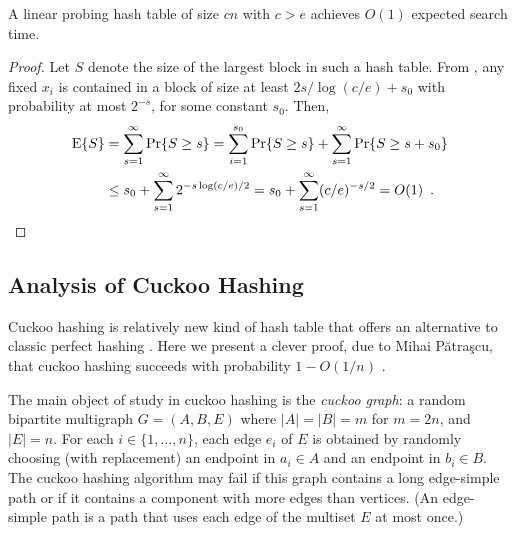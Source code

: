 \documentclass{patmorin}
\begin{document}
\begin{cor}
  A linear probing hash table of size $cn$ with $c > e$ achieves
  $O(1)$ expected search time.
\end{cor}
\begin{proof}
  Let $S$ denote the size of the largest block in such a hash
  table. From , any fixed $x_i$ is contained in
  a block of size at least $2s/\log (c/e) + s_0$ with probability at
  most $2^{-s}$, for some constant $s_0$. Then,
  \begin{align*}
    \operatorname{\mathrm{E}}\{S\} &= \sum_{s = 1}^\infty \Pr\{S \ge s\} = \sum_{i=1}^{s_0} \Pr\{S \ge s\} + \sum_{s = 1}^\infty \Pr\{S \ge s + s_0\} \\
            &\le s_0 + \sum_{s = 1}^\infty 2^{-s \log (c/e)/2} = s_0 + \sum_{s = 1}^\infty (c/e)^{-s/2} = O(1) \enspace . \qedhere
  \end{align*}
\end{proof}

\subsection{Analysis of Cuckoo Hashing}

Cuckoo hashing is relatively new kind of hash table that offers an
alternative to classic perfect hashing \cite{pagh.rodler:cuckoo}. Here
we present a clever proof, due to Mihai Pătraşcu, that cuckoo hashing
succeeds with probability $1-O(1/n)$ \cite{patrascu:cuckoo}.

The main object of study in cuckoo hashing is the \emph{cuckoo graph}:
a random bipartite multigraph $G=(A,B,E)$ where $|A|=|B|=m$ for
$m = 2n$, and $|E|=n$.  For each $i\in\{1,\ldots,n\}$, each edge $e_i$
of $E$ is obtained by randomly choosing (with replacement) an endpoint
in $a_i\in A$ and an endpoint in $b_i\in B$.  The cuckoo hashing
algorithm may fail if this graph contains a long edge-simple path or
if it contains a component with more edges than vertices.  (An
edge-simple path is a path that uses each edge of the multiset $E$ at
most once.)
\end{document}
